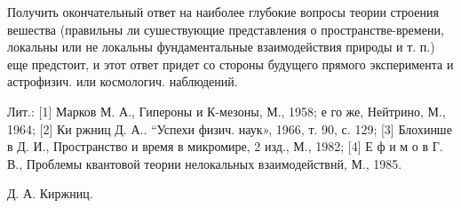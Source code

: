 \documentclass[10pt]{article}
\begin{document}
Получить окончательный ответ на наиболее глубокие вопросы теории строения вешества (правильны ли сушествующие представления о пространстве-времени, локальны или не локальны фундаментальные взаимодействия природы и т. п.) еще предстоит, и этот ответ придет со стороны будущего прямого эксперимента и астрофизич. или космологич. наблюдений.



Лит.: [1] Марков М. А., Гипероны и К-мезоны, М., 1958; е го же, Нейтрино, М., 1964; [2] Ки ржниц Д. А.. “Успехи физич. наук», 1966, т. 90, с. 129; [3] Блохинше в Д. И., Пространство и время в микромире, 2 изд., М., 1982; [4] Е ф и м о в Г. В., Проблемы квантовой теории нелокальных взаимодействнй, М., 1985.



Д. А. Киржниц.
\end{document}
